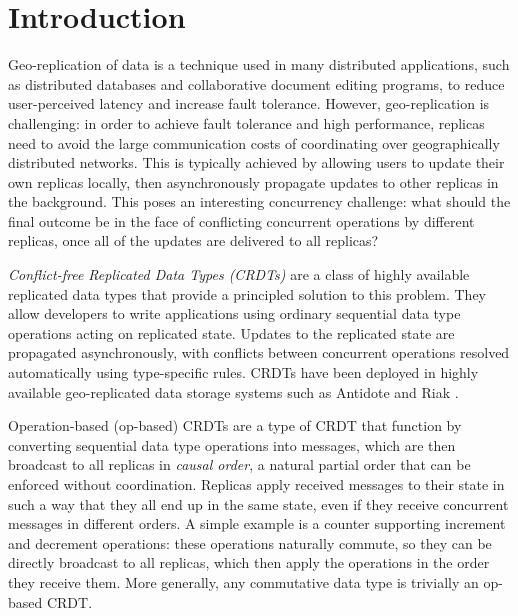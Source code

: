 \documentclass[acmsmall,nonacm,12pt]{acmart}
\theoremstyle{plain}
\theoremstyle{definition}
\begin{document}


\maketitle

\section{Introduction}
Geo-replication of data is a technique used in many distributed applications, such as distributed databases and collaborative document editing programs, to reduce user-perceived latency and increase fault tolerance.  However, geo-replication is challenging: in order to achieve fault tolerance and high performance, replicas need to avoid the large communication costs of coordinating over geographically distributed networks.  This is typically achieved by allowing users to update their own replicas locally, then asynchronously propagate updates to other replicas in the background.  This poses an interesting concurrency challenge: what should the final outcome be in the face of conflicting concurrent operations by different replicas, once all of the updates are delivered to all replicas?

\textit{Conflict-free Replicated Data Types (CRDTs)} \cite{crdt_survey_2011, crdt_summary_2018} are a class of highly available replicated data types that provide a principled solution to this problem.  They allow developers to write applications using ordinary sequential data type operations acting on replicated state.  Updates to the replicated state are propagated asynchronously, with conflicts between concurrent operations resolved automatically using type-specific rules.  CRDTs have been deployed in highly available geo-replicated data storage systems such as Antidote \cite{antidote} and Riak \cite{riak_datatypes}.

Operation-based (op-based) CRDTs \cite{crdt_survey_2011, crdt_summary_2018} are a type of CRDT that function by converting sequential data type operations into messages, which are then broadcast to all replicas in \textit{causal order}, a natural partial order that can be enforced without coordination.  Replicas apply received messages to their state in such a way that they all end up in the same state, even if they receive concurrent messages in different orders.  A simple example is a counter supporting increment and decrement operations: these operations naturally commute, so they can be directly broadcast to all replicas, which then apply the operations in the order they receive them.  More generally, any commutative data type is trivially an op-based CRDT.
\end{document}
